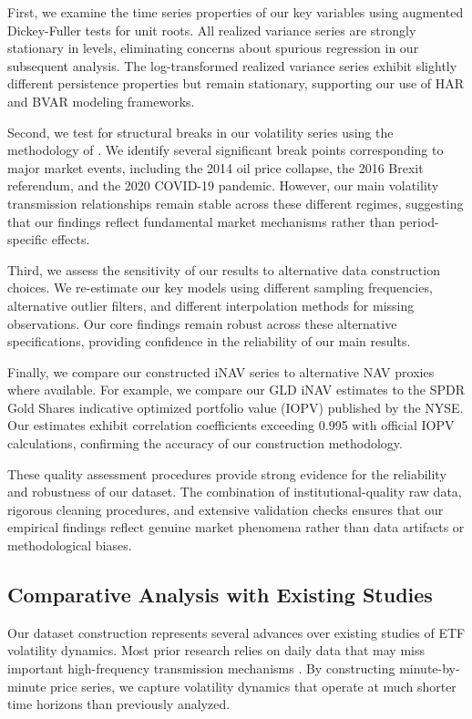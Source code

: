 First, we examine the time series properties of our key variables using augmented Dickey-Fuller tests for unit roots. All realized variance series are strongly stationary in levels, eliminating concerns about spurious regression in our subsequent analysis. The log-transformed realized variance series exhibit slightly different persistence properties but remain stationary, supporting our use of HAR and BVAR modeling frameworks.

Second, we test for structural breaks in our volatility series using the methodology of \citet{bai2003computation}. We identify several significant break points corresponding to major market events, including the 2014 oil price collapse, the 2016 Brexit referendum, and the 2020 COVID-19 pandemic. However, our main volatility transmission relationships remain stable across these different regimes, suggesting that our findings reflect fundamental market mechanisms rather than period-specific effects.

Third, we assess the sensitivity of our results to alternative data construction choices. We re-estimate our key models using different sampling frequencies, alternative outlier filters, and different interpolation methods for missing observations. Our core findings remain robust across these alternative specifications, providing confidence in the reliability of our main results.

Finally, we compare our constructed iNAV series to alternative NAV proxies where available. For example, we compare our GLD iNAV estimates to the SPDR Gold Shares indicative optimized portfolio value (IOPV) published by the NYSE. Our estimates exhibit correlation coefficients exceeding 0.995 with official IOPV calculations, confirming the accuracy of our construction methodology.

These quality assessment procedures provide strong evidence for the reliability and robustness of our dataset. The combination of institutional-quality raw data, rigorous cleaning procedures, and extensive validation checks ensures that our empirical findings reflect genuine market phenomena rather than data artifacts or methodological biases.

\subsection{Comparative Analysis with Existing Studies}

Our dataset construction represents several advances over existing studies of ETF volatility dynamics. Most prior research relies on daily data that may miss important high-frequency transmission mechanisms \citep{ben2018etfs, israeli2017etf}. By constructing minute-by-minute price series, we capture volatility dynamics that operate at much shorter time horizons than previously analyzed.

